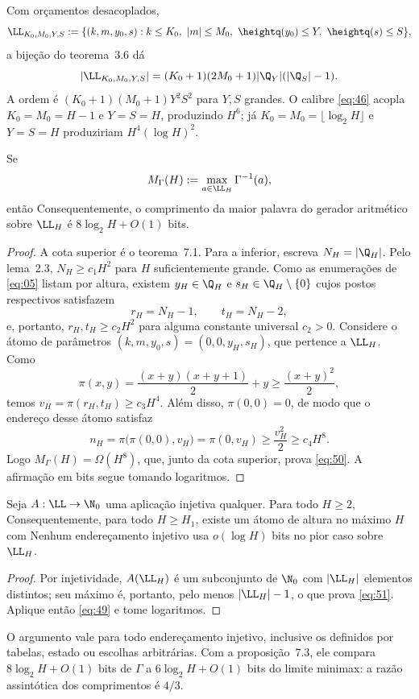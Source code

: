 Com orçamentos desacoplados,
\[
\LL_{K_0,M_0,Y,S}:=\{(k,m,y_0,s):k\le K_0,\ |m|\le M_0,\ \heightq(y_0)\le Y,\ \heightq(s)\le S\},
\]
a bijeção do teorema~3.6 dá
\[
|\LL_{K_0,M_0,Y,S}|=(K_0+1)(2M_0+1)|\Q_Y|(|\Q_S|-1).
\]
A ordem é $(K_0+1)(M_0+1)Y^2S^2$ para $Y,S$ grandes. O calibre \eqref{eq:46} acopla $K_0=M_0=H-1$ e $Y=S=H$, produzindo $H^6$; já $K_0=M_0=\lfloor\log_2H\rfloor$ e $Y=S=H$ produziriam $H^4(\log H)^2$.

\begin{proposicao}
Se
\[
M_\Gamma(H):=\max_{a\in\LL_H}\Gamma^{-1}(a),
\]
então
Consequentemente, o comprimento da maior palavra do gerador aritmético sobre $\LL_H$ é $8\log_2H+O(1)$ bits.
\end{proposicao}
\begin{proof}
A cota superior é o teorema~7.1. Para a inferior, escreva $N_H=|\Q_H|$. Pelo lema~2.3, $N_H\ge c_1H^2$ para $H$ suficientemente grande. Como as enumerações de \eqref{eq:05} listam por altura, existem $y_H\in\Q_H$ e $s_H\in\Q_H\setminus\{0\}$ cujos postos respectivos satisfazem
\[
r_H=N_H-1,\qquad t_H=N_H-2,
\]
e, portanto, $r_H,t_H\ge c_2H^2$ para alguma constante universal $c_2>0$. Considere o átomo de parâmetros $(k,m,y_0,s)=(0,0,y_H,s_H)$, que pertence a $\LL_H$. Como
\[
\pi(x,y)=\frac{(x+y)(x+y+1)}2+y\ge\frac{(x+y)^2}2,
\]
temos $v_H=\pi(r_H,t_H)\ge c_3H^4$. Além disso, $\pi(0,0)=0$, de modo que o endereço desse átomo satisfaz
\[
n_H=\pi\bigl(\pi(0,0),v_H\bigr)=\pi(0,v_H)\ge\frac{v_H^2}2\ge c_4H^8.
\]
Logo $M_\Gamma(H)=\Omega(H^8)$, que, junto da cota superior, prova \eqref{eq:50}. A afirmação em bits segue tomando logaritmos.
\end{proof}

\begin{teorema}
Seja $A:\LL\to\N_0$ uma aplicação injetiva qualquer. Para todo $H\ge2$,
Consequentemente, para todo $H\ge H_1$, existe um átomo de altura no máximo $H$ com
Nenhum endereçamento injetivo usa $o(\log H)$ bits no pior caso sobre $\LL_H$.
\end{teorema}
\begin{proof}
Por injetividade, $A(\LL_H)$ é um subconjunto de $\N_0$ com $|\LL_H|$ elementos distintos; seu máximo é, portanto, pelo menos $|\LL_H|-1$, o que prova \eqref{eq:51}. Aplique então \eqref{eq:49} e tome logaritmos.
\end{proof}
\begin{observacao}
O argumento vale para todo endereçamento injetivo, inclusive os definidos por tabelas, estado ou escolhas arbitrárias. Com a proposição~7.3, ele compara $8\log_2H+O(1)$ bits de $\Gamma$ a $6\log_2H+O(1)$ bits do limite minimax: a razão assintótica dos comprimentos é $4/3$.
\end{observacao}

